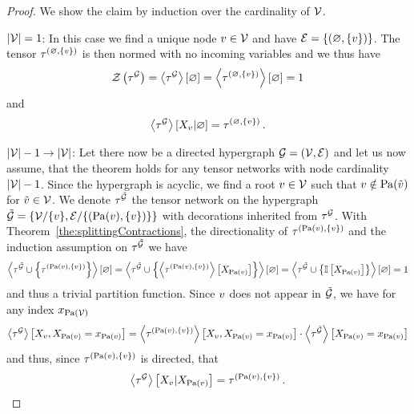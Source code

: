 \begin{proof}
    We show the claim by induction over the cardinality of $\mathcal{V}$.

    $\left|\mathcal{V}\right|=1$: In this case we find a unique node $v\in\mathcal{V}$ and have $\mathcal{E}=\{(\varnothing,\{v\})\}$.
    The tensor $\tau^{(\varnothing,\{v\})}$ is then normed with no incoming variables and we thus have
    \[ \mathcal{Z}\left(\tau^{\mathcal{G}}\right) = \left\langle \tau^{\mathcal{G}}\right\rangle \left[ \varnothing \right] = \left\langle \tau^{(\varnothing,\{v\})}\right\rangle \left[ \varnothing \right] = 1 \]
    and
    \[ \left\langle \tau^{\mathcal{G}}\right\rangle \left[ X_{v} | \varnothing \right] = \tau^{(\varnothing,\{v\})} \, .  \]

    $\left|\mathcal{V}\right|-1 \rightarrow \left|\mathcal{V}\right|$: Let there now be a directed hypergraph $\mathcal{G}=(\mathcal{V},\mathcal{E})$ and let us now assume, that the theorem holds for any tensor networks with node cardinality $\left|\mathcal{V}\right|-1$.
    Since the hypergraph is acyclic, we find a root $v\in\mathcal{V}$ such that $v\notin\mathrm{Pa}(\tilde{v})$ for $\tilde{v}\in\mathcal{V}$.
    We denote $\tau^{\tilde{\mathcal{G}}}$ the tensor network on the hypergraph $\tilde{\mathcal{G}}=\{\mathcal{V}/\{v\},\mathcal{E}/\{(\mathrm{Pa}(v),\{v\})\}\}$ with decorations inherited from $\tau^{\mathcal{G}}$.
    With Theorem~\ref{the:splittingContractions}, the directionality of $\tau^{(\mathrm{Pa}(v),\{v\})}$ and the induction assumption on $\tau^{\tilde{\mathcal{G}}}$ we have
    \begin{align*}
        \left\langle \tau^{\tilde{\mathcal{G}}}\cup\left\{\tau^{(\mathrm{Pa}(v),\{v\})}\right\}\right\rangle \left[ \varnothing \right]
        = \left\langle \tau^{\tilde{\mathcal{G}}}\cup\left\{\left\langle \tau^{(\mathrm{Pa}(v),\{v\})}\right\rangle \left[ X_{\mathrm{Pa}(v)} \right]\right\}\right\rangle \left[ \varnothing \right]
        = \left\langle \tau^{\tilde{\mathcal{G}}}\cup\left\{\mathbb{I}\left[X_{\mathrm{Pa}(v)}\right]\right\}\right\rangle \left[ \varnothing \right]
        = 1
    \end{align*}
    and thus a trivial partition function.
    Since $v$ does not appear in $\tilde{\mathcal{G}}$, we have for any index $x_{\mathrm{Pa}(\mathcal{V})}$
    \begin{align*}
        \left\langle \tau^{\mathcal{G}}\right\rangle \left[ X_{v},X_{\mathrm{Pa}(v)}=x_{\mathrm{Pa}(v)} \right]
        = \left\langle \tau^{(\mathrm{Pa}(v),\{v\})}\right\rangle \left[ X_{v},X_{\mathrm{Pa}(v)}=x_{\mathrm{Pa}(v)} \right]
        \cdot \left\langle \tau^{\tilde{\mathcal{G}}}\right\rangle \left[ X_{\mathrm{Pa}(v)}=x_{\mathrm{Pa}(v)} \right]
    \end{align*}
    and thus, since $\tau^{(\mathrm{Pa}(v),\{v\})}$ is directed, that
    \begin{align*}
        \left\langle \tau^{\mathcal{G}}\right\rangle \left[ X_{v} | X_{\mathrm{Pa}(v)} \right]
        = \tau^{(\mathrm{Pa}(v),\{v\})} \, .
    \end{align*}
\end{proof}

